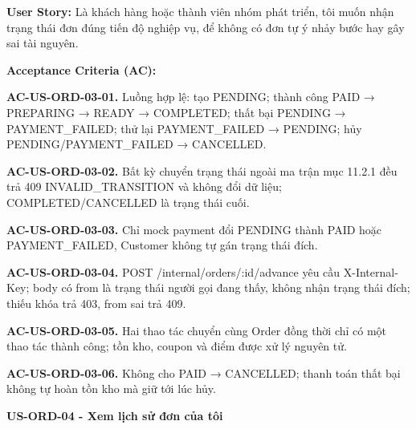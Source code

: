 \documentclass[11pt,a4paper,oneside]{report}
\begin{document}
\textbf{User Story:} Là khách hàng hoặc thành viên nhóm phát triển, tôi muốn nhận trạng thái đơn đúng tiến độ nghiệp vụ, để không có đơn tự ý nhảy bước hay gây sai tài nguyên.

\textbf{Acceptance Criteria (AC):}

\textbf{AC-US-ORD-03-01.} Luồng hợp lệ: tạo PENDING; thành công PAID → PREPARING → READY → COMPLETED; thất bại PENDING → PAYMENT\_FAILED; thử lại PAYMENT\_FAILED → PENDING; hủy PENDING/PAYMENT\_FAILED → CANCELLED.

\textbf{AC-US-ORD-03-02.} Bất kỳ chuyển trạng thái ngoài ma trận mục 11.2.1 đều trả 409 INVALID\_TRANSITION và không đổi dữ liệu; COMPLETED/CANCELLED là trạng thái cuối.

\textbf{AC-US-ORD-03-03.} Chỉ mock payment đổi PENDING thành PAID hoặc PAYMENT\_FAILED, Customer không tự gán trạng thái đích.

\textbf{AC-US-ORD-03-04.} POST /internal/orders/:id/advance yêu cầu X-Internal-Key; body có from là trạng thái người gọi đang thấy, không nhận trạng thái đích; thiếu khóa trả 403, from sai trả 409.

\textbf{AC-US-ORD-03-05.} Hai thao tác chuyển cùng Order đồng thời chỉ có một thao tác thành công; tồn kho, coupon và điểm được xử lý nguyên tử.

\textbf{AC-US-ORD-03-06.} Không cho PAID → CANCELLED; thanh toán thất bại không tự hoàn tồn kho mà giữ tới lúc hủy.

\textbf{US-ORD-04 - Xem lịch sử đơn của tôi}
\end{document}
